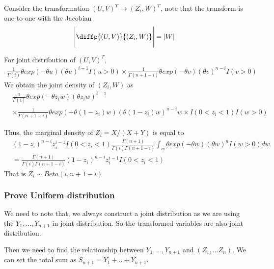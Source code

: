 \documentclass[11pt]{article} %
\begin{document}
Consider the transformation $(U,V)^T \rightarrow (Z_i, W)^T$, note that the transform is one-to-one with the Jacobian
\begin{align*}
	\Bigg |\diffp{(U,V)}{{(Z_i, W)}} \Bigg | &= |W|
\end{align*}
 
For joint distribution of  $(U,V)^T$, 
\begin{align*}
	\frac{1}{\Gamma{(i)}} \theta exp(-\theta u) (\theta u)^{i-1} I(u > 0) \times \frac{1}{\Gamma{(n+1-i)}} \theta exp(-\theta v) (\theta v)^{n-i} I(v > 0)
\end{align*}
We obtain the joint density of $(Z_i, W)$ as 
\begin{align*}
&	\frac{1}{\Gamma{(i)}} \theta exp(-\theta z_i w) (\theta z_i w)^{i-1} \\
	& \times \frac{1}{\Gamma{(n+1-i)}} \theta exp(-\theta (1-z_i) w) (\theta (1-z_i) w)^{n-i} w \times I(0< z_i< 1) I(w > 0)
\end{align*}

Thus, the marginal density of $Z_i = X/(X+Y)$ is equal to
\begin{align*}
 & (1-z_i)^{n-i} z_i^{i-1} I(0< z_i <1)	\frac{\Gamma(n+1)}{\Gamma(i) \Gamma(n+1-i)} \int_{w} \theta exp(-\theta w) (\theta w)^n I(w>0) 	dw \\
 &= \frac{\Gamma(n+1)}{\Gamma(i) \Gamma(n+1-i)} (1-z_i)^{n-i} z_i^{i-1} I(0< z_i <1)
\end{align*}
That is $Z_i \sim Beta(i, n+1-i)$

\subsubsection{Prove Uniform distribution}



We need to note that, we always construct a joint distribution as we are using the $Y_1, ..., Y_{n+1}$ in joint distribution. So the transformed variables are also joint distribution.

Then we need to find the relationship between $Y_1, ..., Y_{n+1}$ and $(Z_1, ... Z_n)$. We can set the total sum as $S_{n+1} = Y_1+ .. + Y_{n+1}$.
\end{document}
